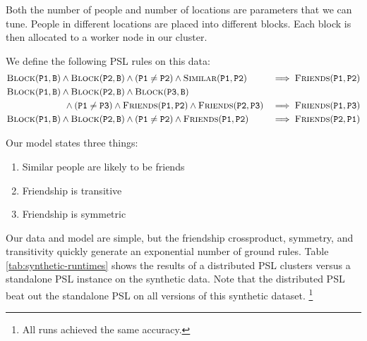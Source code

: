 \documentclass{article}
\begin{document}
Both the number of people and number of locations are parameters that we can tune.
People in different locations are placed into different blocks.
Each block is then allocated to a worker node in our cluster.

We define the following PSL rules on this data:
\begin{eqnarray}
	\begin{aligned}
        & \textsc{Block}(\texttt{P1}, \texttt{B}) \wedge \textsc{Block}(\texttt{P2}, \texttt{B}) \wedge (\texttt{P1} \neq \texttt{P2}) \wedge \textsc{Similar}(\texttt{P1}, \texttt{P2}) & \implies \textsc{Friends}(\texttt{P1}, \texttt{P2}) \\ \nonumber
        & \textsc{Block}(\texttt{P1}, \texttt{B}) \wedge \textsc{Block}(\texttt{P2}, \texttt{B}) \wedge \textsc{Block}(\texttt{P3}, \texttt{B}) \\ \nonumber 
        & \ \ \ \ \ \ \ \ \ \ \ \ \ \ \ \ \ \ \  \wedge (\texttt{P1} \neq \texttt{P3}) \wedge  \textsc{Friends}(\texttt{P1}, \texttt{P2}) \wedge \textsc{Friends}(\texttt{P2}, \texttt{P3}) & \implies \textsc{Friends}(\texttt{P1}, \texttt{P3})  \\ \nonumber
        & \textsc{Block}(\texttt{P1}, \texttt{B}) \wedge \textsc{Block}(\texttt{P2}, \texttt{B}) \wedge (\texttt{P1} \neq \texttt{P2}) \wedge \textsc{Friends}(\texttt{P1}, \texttt{P2}) & \implies \textsc{Friends}(\texttt{P2}, \texttt{P1})
    \end{aligned}
\end{eqnarray}

Our model states three things:
\begin{enumerate}
    \item Similar people are likely to be friends
    \item Friendship is transitive
    \item Friendship is symmetric
\end{enumerate}

Our data and model are simple, but the friendship crossproduct, symmetry, and transitivity quickly generate an exponential number of ground rules.
Table \ref{tab:synthetic-runtimes} shows the results of a distributed PSL clusters versus a standalone PSL instance on the synthetic data.
Note that the distributed PSL beat out the standalone PSL on all versions of this synthetic dataset.
\footnote{All runs achieved the same accuracy.}
\end{document}

